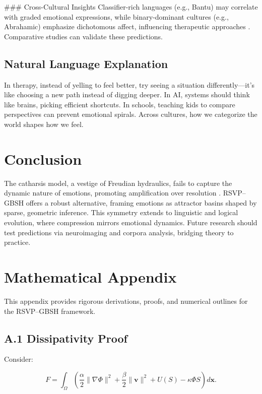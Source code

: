 \documentclass[11pt]{article}
\theoremstyle{plain}
\begin{document}
### Cross-Cultural Insights
Classifier-rich languages (e.g., Bantu) may correlate with graded emotional expressions, while binary-dominant cultures (e.g., Abrahamic) emphasize dichotomous affect, influencing therapeutic approaches \citep{Aikhenvald2000}. Comparative studies can validate these predictions.

\subsection{Natural Language Explanation}
In therapy, instead of yelling to feel better, try seeing a situation differently—it’s like choosing a new path instead of digging deeper. In AI, systems should think like brains, picking efficient shortcuts. In schools, teaching kids to compare perspectives can prevent emotional spirals. Across cultures, how we categorize the world shapes how we feel.

\section{Conclusion}

The catharsis model, a vestige of Freudian hydraulics, fails to capture the dynamic nature of emotions, promoting amplification over resolution \citep{Douglas1966}. RSVP–GBSH offers a robust alternative, framing emotions as attractor basins shaped by sparse, geometric inference. This symmetry extends to linguistic and logical evolution, where compression mirrors emotional dynamics. Future research should test predictions via neuroimaging and corpora analysis, bridging theory to practice.

\newpage
\appendix

\section{Mathematical Appendix}

This appendix provides rigorous derivations, proofs, and numerical outlines for the RSVP–GBSH framework.

\subsection{A.1 Dissipativity Proof}

Consider:

\[
F = \int_\Omega \left( \frac{\alpha}{2} \|\nabla \Phi\|^2 + \frac{\beta}{2} \|\mathbf{v}\|^2 + U(S) - \kappa \Phi S \right) d\mathbf{x}.
\]
\end{document}
